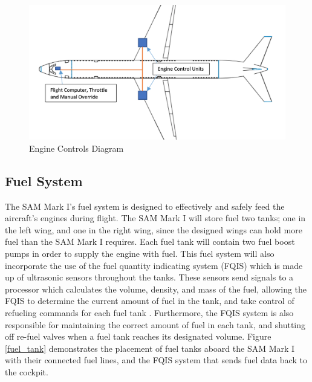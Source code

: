 \begin{figure}[H]
    \centering
    \includegraphics[width=.85\linewidth]{Photos/systems/engine_controls.png}
    \caption{Engine Controls Diagram}
    \label{engine_controls}
\end{figure}

\subsection{Fuel System}
The SAM Mark I’s fuel system is designed to effectively and safely feed the aircraft’s engines during flight. The SAM Mark I will store fuel two tanks; one in the left wing, and one in the right wing, since the designed wings can hold more fuel than the SAM Mark I requires. Each fuel tank will contain two fuel boost pumps in order to supply the engine with fuel. This fuel system will also incorporate the use of the fuel quantity indicating system (FQIS) which is made up of ultrasonic sensors throughout the tanks. These sensors send signals to a processor which calculates the volume, density, and mass of the fuel, allowing the FQIS to determine the current amount of fuel in the tank, and take control of refueling commands for each fuel tank \cite{fuel_system}. Furthermore, the FQIS system is also responsible for maintaining the correct amount of fuel in each tank, and shutting off re-fuel valves when a fuel tank reaches its designated volume. Figure \ref{fuel_tank} demonstrates the placement of fuel tanks aboard the SAM Mark I with their connected fuel lines, and the FQIS system that sends fuel data back to the cockpit.

